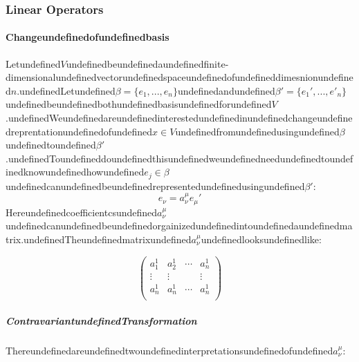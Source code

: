 \subsubsection{Linear Operators}

\paragraph{Changeundefinedofundefinedbasis}

Letundefined$V$undefinedbeundefinedaundefinedfinite-dimensionalundefinedvectorundefinedspaceundefinedofundefineddimesnionundefined$n$.undefinedLetundefined$\beta=\{e_1,...,e_n\}$undefinedandundefined$\beta'=\{e_1',...,e'_n\}$undefinedbeundefinedbothundefinedbasisundefinedforundefined$V$.undefinedWeundefinedareundefinedinterestedundefinedinundefinedchangeundefinedreprentationundefinedofundefined$x\in V$undefinedfromundefinedusingundefined$\beta$undefinedtoundefined$\beta'$.undefinedToundefineddoundefinedthisundefinedweundefinedneedundefinedtoundefinedknowundefinedhowundefined$e_j\in \beta$undefinedcanundefinedbeundefinedrepresentedundefinedusingundefined$\beta'$:
\begin{equation}
e_\nu = a_{\nu}^{\mu} e_{\mu}'
\end{equation}
Hereundefinedcoefficientcsundefined$a_{\nu}^{\mu}$undefinedcanundefinedbeundefinedorgainizedundefinedintoundefinedaundefinedmatrix.undefinedTheundefinedmatrixundefined$a_{\nu}^{\mu}$undefinedlooksundefinedlike:

\begin{equation}
\begin{pmatrix}
a_1^1 & a_2^1 & \cdots & a_n^1\\
\vdots &\vdots  & &\vdots\\
a_n^1 & a_n^1 & \cdots & a_n^1\\
\end{pmatrix}
\end{equation}

\subparagraph{ContravariantundefinedTransformation}

Thereundefinedareundefinedtwoundefinedinterpretationsundefinedofundefined$a_{\nu}^{\mu}$:

